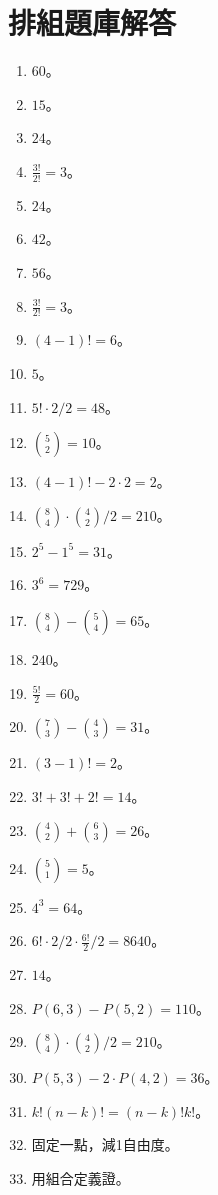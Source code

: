 \section{排組題庫解答}
\begin{enumerate}[label=\arabic*.]
    \item $60$。
    \item $15$。
    \item $24$。
    \item $\frac{3!}{2!} = 3$。
    \item $24$。
    \item $42$。
    \item $56$。
    \item $\frac{3!}{2!} = 3$。
    \item $(4-1)! = 6$。
    \item $5$。
    \item $5! \cdot 2 / 2 = 48$。
    \item $\binom{5}{2} = 10$。
    \item $(4-1)! - 2 \cdot 2 = 2$。
    \item $\binom{8}{4} \cdot \binom{4}{2} / 2 = 210$。
    \item $2^5 - 1^5 = 31$。
    \item $3^6 = 729$。
    \item $\binom{8}{4} - \binom{5}{4} = 65$。
    \item $240$。
    \item $\frac{5!}{2} = 60$。
    \item $\binom{7}{3} - \binom{4}{3} = 31$。
    \item $(3-1)! = 2$。
    \item $3! + 3! + 2! = 14$。
    \item $\binom{4}{2} + \binom{6}{3} = 26$。
    \item $\binom{5}{1} = 5$。
    \item $4^3 = 64$。
    \item $6! \cdot 2 / 2 \cdot \frac{6!}{2} / 2 = 8640$。
    \item $14$。
    \item $P(6, 3) - P(5, 2) = 110$。
    \item $\binom{8}{4} \cdot \binom{4}{2} / 2 = 210$。
    \item $P(5, 3) - 2 \cdot P(4, 2) = 36$。
    \item $k!(n-k)! = (n-k)!k!$。
    \item 固定一點，減1自由度。
    \item 用組合定義證。

\end{enumerate}
